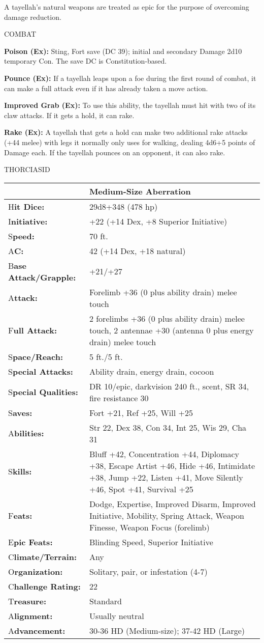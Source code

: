 \documentclass{article}
\begin{document}
{A tayellah's natural weapons are treated as epic for the purpose of overcoming 
damage reduction.

COMBAT 

\textbf{Poison (Ex):} Sting, Fort save (DC 39); initial and secondary Damage 2d10 
temporary Con. The save DC is Constitution-based.

\textbf{Pounce (Ex):} If a tayellah leaps upon a foe during the first round of 
combat, it can make a full attack even if it has already taken a move action. 

\textbf{Improved Grab (Ex):} To use this ability, the tayellah must hit with two 
of its claw attacks. If it gets a hold, it can rake. 

\textbf{Rake (Ex):} A tayellah that gets a hold can make two additional rake attacks 
(+44 melee) with legs it normally only uses for walking, dealing 4d6+5 points of 
Damage each. If the tayellah pounces on an opponent, it can also rake. 

\vspace{12pt}
{\LARGE{}THORCIASID }

\begin{tabular}{|>{\raggedright}p{64pt}|>{\raggedright}p{261pt}|}
\hline
  & Medium-Size Aberration \tabularnewline
\hline
H\textbf{it Dice:} & 29d8+348 (478 hp) \tabularnewline
\hline
I\textbf{nitiative:} & +22 (+14 Dex, +8 Superior Initiative) \tabularnewline
\hline
S\textbf{peed:} & 70 ft. \tabularnewline
\hline
A\textbf{C:} & 42 (+14 Dex, +18 natural) \tabularnewline
\hline
B\textbf{ase Attack/Grapple:} & +21/+27\tabularnewline
\hline
A\textbf{ttack:} & Forelimb +36 (0 plus ability drain) melee touch\tabularnewline
\hline
F\textbf{ull Attack:} & 2 forelimbs +36 (0 plus ability drain) melee touch, 2 antennae 
+30 (antenna 0 plus energy drain) melee touch\tabularnewline
\hline
S\textbf{pace/Reach:} & 5 ft./5 ft. \tabularnewline
\hline
S\textbf{pecial Attacks:} & Ability drain, energy drain, cocoon \tabularnewline
\hline
S\textbf{pecial Qualities:} & DR 10/epic, darkvision 240 ft., scent, SR 34, fire 
resistance 30 \tabularnewline
\hline
S\textbf{aves:} & Fort +21, Ref +25, Will +25 \tabularnewline
\hline
A\textbf{bilities:} & Str 22, Dex 38, Con 34, Int 25, Wis 29, Cha 31 \tabularnewline
\hline
S\textbf{kills:} & Bluff +42, Concentration +44, Diplomacy +38, Escape Artist +46, 
Hide +46, Intimidate +38, Jump +22, Listen +41, Move Silently +46, Spot +41, Survival 
+25\tabularnewline
\hline
F\textbf{eats:} & Dodge, Expertise, Improved Disarm, Improved Initiative, Mobility, 
Spring Attack, Weapon Finesse, Weapon Focus (forelimb) \tabularnewline
\hline
E\textbf{pic Feats:} & Blinding Speed, Superior Initiative \tabularnewline
\hline
C\textbf{limate/Terrain:} & Any \tabularnewline
\hline
O\textbf{rganization:} & Solitary, pair, or infestation (4-7) \tabularnewline
\hline
C\textbf{hallenge Rating:} & 22 \tabularnewline
\hline
T\textbf{reasure:} & Standard \tabularnewline
\hline
A\textbf{lignment:} & Usually neutral \tabularnewline
\hline
A\textbf{dvancement:} & 30-36 HD (Medium-size); 37-42 HD (Large) \tabularnewline
\hline
\end{tabular}

}
\end{document}
